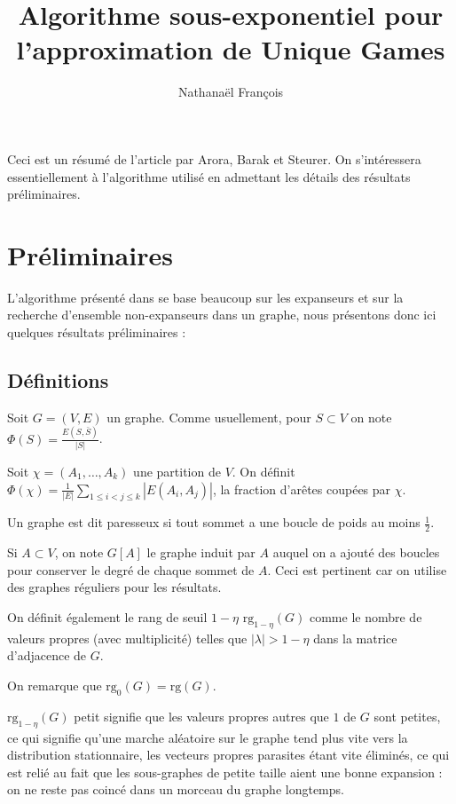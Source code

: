 \documentclass[a4paper,10pt]{article}
\title{Algorithme sous-exponentiel pour l'approximation de Unique Games}
\author{Nathanaël François}
\theoremstyle{plain}
\theoremstyle{Definition}
\theoremstyle{remark}
\newcommand{\rg}{\mathrm{rg}}
\begin{document}
\maketitle

Ceci est un résumé de l'article \cite{St10} par Arora, Barak et Steurer. On
s'intéressera essentiellement à l'algorithme utilisé en admettant les
détails des résultats préliminaires.

\section{Préliminaires}

L'algorithme présenté dans \cite{St10} se base beaucoup sur les expanseurs
et sur la recherche d'ensemble non-expanseurs dans un graphe, nous
présentons donc ici quelques résultats préliminaires :

\subsection{Définitions}

Soit $G=(V,E)$ un graphe. Comme usuellement, pour $S \subset V$ on note
$\displaystyle \Phi(S) = \frac{E(S,\bar{S})}{|S|}$.

Soit $\chi=(A_1,\dots,A_k)$ une partition de $V$. On définit $\displaystyle
\Phi(\chi) = \frac{1}{|E|}\sum_{1 \leq i < j \leq k} |E(A_i,A_j)|$, la
fraction d'arêtes coupées par $\chi$.

\vspace{0.5cm}

Un graphe est dit paresseux si tout sommet a une boucle de poids au moins
$\frac{1}{2}$.

Si $A \subset V$, on note $G[A]$ le graphe induit par $A$ auquel on a
ajouté des boucles pour conserver le degré de chaque sommet de $A$. Ceci
est pertinent car on utilise des graphes réguliers pour les résultats.

\vspace{0.5cm}

On définit également le rang de seuil $1-\eta$ $\rg_{1-\eta}(G)$
comme le nombre de valeurs propres (avec multiplicité) telles que
$|\lambda| > 1- \eta$ dans la matrice d'adjacence de $G$.

On remarque que $\rg_0(G) = \rg(G)$.

\vspace{0.5cm}

$\rg_{1-\eta}(G)$ petit signifie que les valeurs propres autres que $1$ de
$G$ sont petites, ce qui signifie qu'une marche aléatoire sur le graphe
tend plus vite vers la distribution stationnaire, les vecteurs propres
parasites étant vite éliminés, ce qui est relié au fait que les
sous-graphes de petite taille aient une bonne expansion : on ne reste pas
coincé dans un morceau du graphe longtemps.
\end{document}
